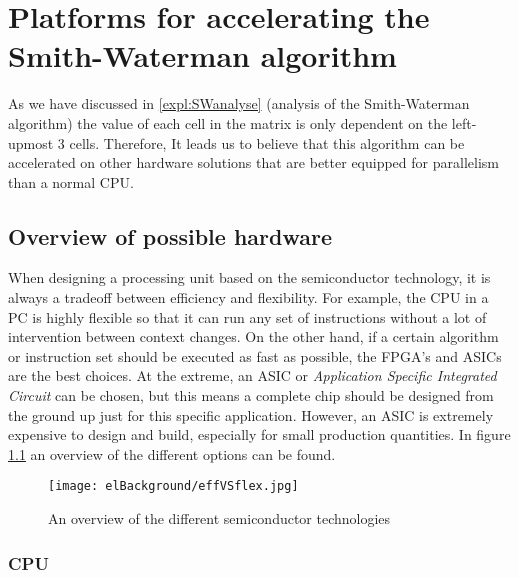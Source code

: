 
\chapter{Platforms for accelerating the Smith-Waterman algorithm}
\label{ch:Platforms}

As we have discussed in \ref{expl:SWanalyse} (analysis of the Smith-Waterman algorithm) the value of each cell in the matrix is only dependent on the left-upmost 3 cells. Therefore, It leads us to believe that this algorithm can be accelerated on other hardware solutions that are better equipped for parallelism than a normal CPU.

\section{Overview of possible hardware}

When designing a processing unit based on the semiconductor technology, it is always a tradeoff between efficiency and flexibility. For example, the CPU in a PC is highly flexible so that it can run any set of instructions without a lot of intervention between context changes. On the other hand, if a certain algorithm or instruction set should be executed as fast as possible, the FPGA's and ASICs are the best choices. At the extreme, an ASIC or \emph{Application Specific Integrated Circuit} can be chosen, but this means a complete chip should be designed from the ground up just for this specific application. However, an ASIC is extremely expensive to design and build, especially for small production quantities. In figure \ref{fig:effVSflex} an overview of the different options can be found.

\begin{figure}[H]
	\centering
	\texttt{[image: elBackground/effVSflex.jpg]}
	\caption{An overview of the different semiconductor technologies}
	\label{fig:effVSflex}
\end{figure}

\subsection{CPU}

